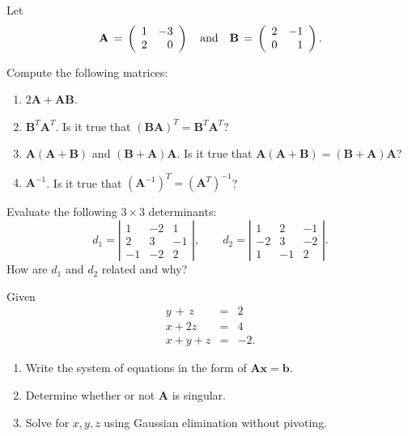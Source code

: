 \documentclass[12pt]{article}
\def\bA{\mathbf{A}}
\def\bB{\mathbf{B}}
\begin{document}
\maketitle





\newpage
\question
 Let
\[ \bA \,=\, \left( \begin{array}{rr} 1 & -3 \\ 2 &  0 \end{array} \right) \quad
\hbox{and} \quad
\bB \,=\, \left( \begin{array}{rr} 2 &-1 \\ 0 & 1 \end{array} \right).\]

Compute the following matrices:
	\begin{enumerate}
	\item $2\bA+ \bA\bB$.  
	\item $\bB^T \bA^T$. Is it true that $(\bB \bA)^T = \bB^T \bA^T$?
	\item $\bA (\bA +\bB)$ and $(\bB +\bA) \bA$.    Is it true that $ \bA (\bA +\bB) = (\bB +\bA) \bA$?
	\item $ \bA^{-1}$.  Is it true that $(\bA ^{-1})^T=  (\bA^T)^{-1}$?
	\end{enumerate}



\question
Evaluate the following  $3\times 3$ determinants:
 $$  d_1 = \left| \begin{array}{rrr} 1&-2&1 \\
  2 & 3 & -1\\-1&-2&2 \end{array} \right|, \qquad
	d_2=  \left| \begin{array}{rrr}
	1 & 2 & -1\\  
	-2& 3 &-2 \\
	 1&-1 & 2 \end{array} \right|. $$ 
How are  $d_1$ and $d_2$  related and why? 


\question 
Given
\vspace{-0.5cm}
\begin{eqnarray*}
y\,+\,z&=&2\\
x+2z&=&4\\
x + y+z&=&-2 .
\end{eqnarray*}
            \begin{enumerate}
            \item Write the system of  equations in the form of $\bA \mathbf{x}=\mathbf{b}$.
            \item\label{q1207b}  Determine whether or not {\bf A} is singular.  
            \item  Solve for $x,y,z$ using Gaussian elimination without pivoting.
    \end{enumerate}
	
\end{document}
